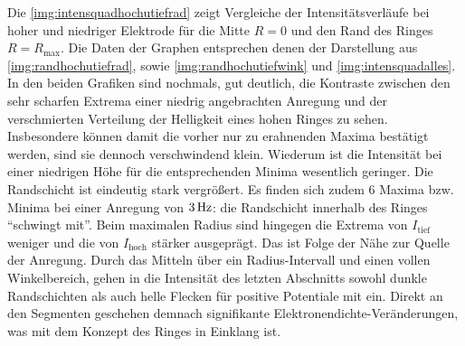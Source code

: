 \documentclass[numbers=noenddot,a4paper]{scrartcl}
\newcommand{\ix}[1]{_\text{#1}}
\begin{document}
					Die \ref{img:intensquadhochutiefrad} zeigt Vergleiche der Intensitätsverläufe bei hoher und niedriger Elektrode für die Mitte $R=0$ und den Rand des Ringes $R=R\ix{max}$. Die Daten der Graphen entsprechen denen der Darstellung aus \ref{img:randhochutiefrad}, sowie \ref{img:randhochutiefwink} und \ref{img:intensquadalles}. In den beiden Grafiken sind nochmals, gut deutlich, die Kontraste zwischen den sehr scharfen Extrema einer niedrig angebrachten Anregung und der verschmierten Verteilung der Helligkeit eines hohen Ringes zu sehen. Insbesondere können damit die vorher nur zu erahnenden Maxima bestätigt werden, sind sie dennoch verschwindend klein. Wiederum ist die Intensität bei einer niedrigen Höhe für die entsprechenden Minima wesentlich geringer. Die Randschicht ist eindeutig stark vergrößert. Es finden sich zudem 6 Maxima bzw. Minima bei einer Anregung von $\unit[3]{Hz}$: die Randschicht innerhalb des Ringes "`schwingt mit"'. Beim maximalen Radius sind hingegen die Extrema von $I\ix{tief}$ weniger und die von $I\ix{hoch}$ stärker ausgeprägt. Das ist Folge der Nähe zur Quelle der Anregung. Durch das Mitteln über ein Radius-Intervall und einen vollen Winkelbereich, gehen in die Intensität des letzten Abschnitts sowohl dunkle Randschichten als auch helle Flecken für positive Potentiale mit ein. Direkt an den Segmenten geschehen demnach signifikante Elektronendichte-Veränderungen, was mit dem Konzept des Ringes in Einklang ist.
\end{document}
